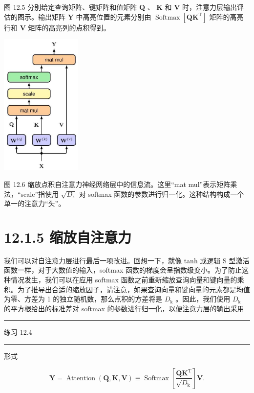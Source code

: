 \documentclass[10pt]{article}
\newcommand{\HRule}{\begin{center}\rule{0.9\linewidth}{0.2mm}\end{center}}
\begin{document}
图 12.5 分别给定查询矩阵、键矩阵和值矩阵 \(\mathbf{Q}\) 、 \(\mathbf{K}\) 和 \(\mathbf{V}\) 时，注意力层输出评估的图示。输出矩阵 \(\mathbf{Y}\) 中高亮位置的元素分别由 \(\operatorname{Softmax}\left\lbrack  {\mathbf{Q}{\mathbf{K}}^{\mathrm{T}}}\right\rbrack\) 矩阵的高亮行和 \(\mathbf{V}\) 矩阵的高亮列的点积得到。

\begin{center}
\includegraphics[max width=0.3\textwidth]{images/0194e279-9b28-703a-88f4-c3ac21e2010d_385_998_351_385_683_0.jpg}
\end{center}
\hspace*{3em} 

图 12.6 缩放点积自注意力神经网络层中的信息流。这里“mat mul”表示矩阵乘法，“scale”指使用 \(\sqrt{{D}_{\mathrm{k}}}\) 对 softmax 函数的参数进行归一化。这种结构构成一个单一的注意力“头”。

\section*{12.1.5 缩放自注意力}

我们可以对自注意力层进行最后一项改进。回想一下，就像 tanh 或逻辑 S 型激活函数一样，对于大数值的输入，softmax 函数的梯度会呈指数级变小。为了防止这种情况发生，我们可以在应用 softmax 函数之前重新缩放查询向量和键向量的乘积。为了推导出合适的缩放因子，请注意，如果查询向量和键向量的元素都是均值为零、方差为 1 的独立随机数，那么点积的方差将是 \({D}_{\mathrm{k}}\) 。因此，我们使用 \({D}_{\mathrm{k}}\) 的平方根给出的标准差对 softmax 的参数进行归一化，以便注意力层的输出采用

\HRule

练习 12.4

\HRule

形式

\[
\mathbf{Y} = \operatorname{Attention}\left( {\mathbf{Q},\mathbf{K},\mathbf{V}}\right)  \equiv  \operatorname{Softmax}\left\lbrack  \frac{{\mathbf{{QK}}}^{\mathrm{T}}}{\sqrt{{D}_{\mathrm{k}}}}\right\rbrack  \mathbf{V}. \tag{12.14}
\]
\end{document}
